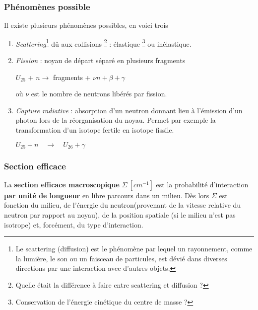 \subsubsection{Phénomènes possible}
Il existe plusieurs phénomènes possibles, en voici trois
\begin{enumerate}
\item \textit{Scattering}\footnote{Le scattering (diffusion) est le phénomène par lequel un rayonnement, comme la lumière, le son ou un faisceau de particules, est dévié dans diverses directions par une interaction avec d'autres objets.} dû aux collisions
\footnote{Quelle était la différence à faire entre scattering et diffusion ?} : élastique 
\footnote{Conservation de l'énergie cinétique du centre de masse ?} ou inélastique.
\item \textit{Fission} : noyau de départ séparé en plusieurs fragments
\begin{center}
$U_{25}$ + $n$\quad$\to$ fragments + $\nu n + \beta + \gamma$
\end{center}
où $\nu$ est le nombre de neutrons libérés par fission.
\item \textit{Capture radiative} : absorption d'un neutron donnant lieu à l'émission
d'un photon lors de la réorganisation du noyau. Permet par exemple la transformation d'un isotope fertile 
en isotope fissile.
\begin{center}
$U_{25} + n\quad\to\quad U_{26}+\gamma$
\end{center}
\end{enumerate}



\subsubsection{Section efficace}
La \textbf{section efficace macroscopique} $\Sigma\ [cm^{-1}]$ est la probabilité d'interaction \textbf{par unité de 
longueur} en libre parcours dans un milieu.
Dès lors $\Sigma$ est fonction du milieu, de l'énergie du neutron(provenant de la vitesse relative du neutron par rapport
au noyau), de la position spatiale (si le milieu n'est pas isotrope) et, forcément, du type d'interaction.

